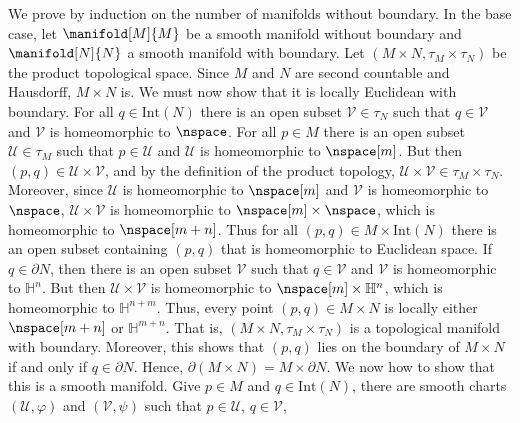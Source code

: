 \documentclass{article}                                                        %
\begin{document}
            \begin{solution}
                We prove by induction on the number of manifolds without boundary.
                In the base case, let $\manifold[M]{M}$ be a smooth manifold without
                boundary and $\manifold[N]{N}$ a smooth manifold with boundary.
                Let $(M\times{N},\tau_{M}\times\tau_{N})$ be the product topological
                space. Since $M$ and $N$ are second countable and Hausdorff,
                $M\times{N}$ is. We must now show that it is locally Euclidean with
                boundary. For all $q\in\textrm{Int}(N)$ there is an open subset
                $\mathcal{V}\in\tau_{N}$ such that $q\in\mathcal{V}$ and
                $\mathcal{V}$ is homeomorphic to $\nspace$. For all $p\in{M}$ there
                is an open subset $\mathcal{U}\in\tau_{M}$ such that
                $p\in\mathcal{U}$ and $\mathcal{U}$ is homeomorphic to $\nspace[m]$.
                But then $(p,q)\in\mathcal{U}\times\mathcal{V}$, and by the
                definition of the product topology,
                $\mathcal{U}\times\mathcal{V}\in\tau_{M}\times\tau_{N}$. Moreover,
                since $\mathcal{U}$ is homeomorphic to $\nspace[m]$ and
                $\mathcal{V}$ is homeomorphic to $\nspace$,
                $\mathcal{U}\times\mathcal{V}$ is homeomorphic to
                $\nspace[m]\times\nspace$, which is homeomorphic to $\nspace[m+n]$.
                Thus for all $(p,q)\in{M}\times\textrm{Int}(N)$ there is an open
                subset containing $(p,q)$ that is homeomorphic to Euclidean space.
                If $q\in\partial{N}$, then there is an open subset
                $\mathcal{V}$ such that $q\in\mathcal{V}$ and $\mathcal{V}$ is
                homeomorphic to $\mathbb{H}^{n}$. But then
                $\mathcal{U}\times\mathcal{V}$ is homeomorphic to
                $\nspace[m]\times\mathbb{H}^{n}$, which is homeomorphic to
                $\mathbb{H}^{n+m}$. Thus, every point $(p,q)\in{M}\times{N}$ is
                locally either $\nspace[m+n]$ or $\mathbb{H}^{m+n}$. That is,
                $(M\times{N},\tau_{M}\times\tau_{N})$ is a topological manifold
                with boundary. Moreover, this shows that $(p,q)$ lies on the
                boundary of $M\times{N}$ if and only if $q\in\partial{N}$. Hence,
                $\partial(M\times{N})=M\times\partial{N}$. We now how to show that
                this is a smooth manifold. Give $p\in{M}$ and $q\in\textrm{Int}(N)$,
                there are smooth charts $(\mathcal{U},\varphi)$ and
                $(\mathcal{V},\psi)$ such that $p\in\mathcal{U}$, $q\in\mathcal{V}$,

\end{solution}
\end{document}
